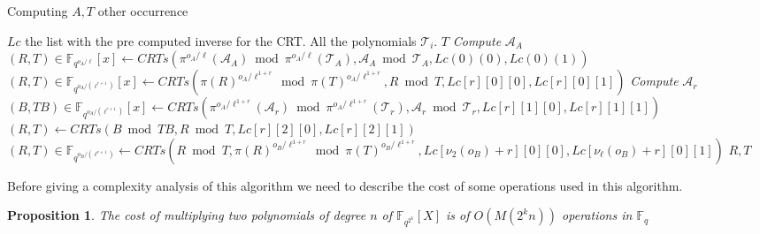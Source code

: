 \documentclass{lms}
\newtheorem{prop}[thm]{Proposition}
\begin{document}
\begin{algorithm}
\caption{\label{computingT2ir}Computing $A,T$ other occurrence}
\begin{algorithmic}[5]
\REQUIRE $Lc$ the list with the pre computed inverse for the CRT. All the polynomials $\mathcal{T}_i$.
\ENSURE $T$
\STATE \textit{Compute} $\mathcal{A}_A$ %
\STATE $\left( R,T \right) \in \mathbb{F}_{q^{o_A/\ell}}[x] \gets CRTs \left( \pi^{o_A/\ell}(\mathcal{A}_A) \bmod  \pi^{o_A/\ell}(\mathcal{T}_A),\mathcal{A}_A \bmod \mathcal{T}_A,Lc(0)(0),Lc(0)(1) \right)$
\STATE $\left( R , T \right) \in \mathbb{F}_{q^{o_A/(\ell^{r+1})}}[x] \gets CRTs \left( \pi(R)^{o_A/\ell^{1+r}} \bmod \pi(T)^{o_A/\ell^{1+r}}, R \bmod T,Lc[r][0][0],Lc[r][0][1] \right) $
\STATE \textit{Compute} $\mathcal{A}_r$%
\STATE $\left( B,TB \right)\in \mathbb{F}_{q^{o_A/(\ell^{r+1})}}[x]  \gets CRTs \left( \pi^{o_A/\ell^{1+r}}(\mathcal{A}_r) \bmod \pi^{o_A/\ell^{1+r}} (\mathcal{T}_r),\mathcal{A}_r \bmod \mathcal{T}_r,Lc[r][1][0],Lc[r][1][1] \right)$
\STATE $\left( R,T \right) \gets CRTs \left(B \bmod TB, R \bmod T, Lc[r][2][0],Lc[r][2][1] \right) $
\ENDFOR
{}%
\STATE $\left( R , T \right)\in \mathbb{F}_{q^{o_B/(\ell^{r+1})}} \gets CRTs \left( R \bmod T ,\pi(R)^{o_B/\ell^{1+r}} \bmod \pi(T)^{o_B/\ell^{1+r}}, Lc[\nu_2(o_B)+r][0][0],Lc[\nu_\ell(o_B)+r][0][1] \right)$
\ENDFOR
\RETURN $R,T$
\end{algorithmic}
\end{algorithm}

Before giving a complexity analysis of this algorithm we need to describe the cost of some operations used in this algorithm.

\begin{prop}
The cost of multiplying two polynomials of degree $n$ of $\mathbb{F}_{q^{2^k}}[X] $ is of $O(M(2^kn))$ operations in $\mathbb{F}_q$
\end{prop}
\end{document}
